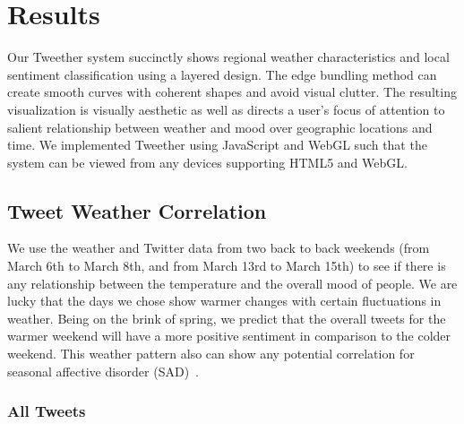 \section{Results}

Our Tweether system succinctly shows regional weather characteristics and local sentiment classification using a layered design. The edge bundling method can create smooth curves with coherent shapes and avoid visual clutter. The resulting visualization is visually aesthetic as well as directs a user's focus of attention to salient relationship between weather and mood over geographic locations and time. We implemented Tweether using JavaScript and WebGL such that the system can be viewed from any devices supporting HTML5 and WebGL.


%


\subsection{Tweet Weather Correlation}

We use the weather and Twitter data from two back to back weekends (from March 6th to March 8th, and from March 13rd to March 15th) to see if there is any relationship between the temperature and the overall mood of people. We are lucky that the days we chose show warmer changes with certain fluctuations in weather. Being on the brink of spring, we predict that the overall tweets for the warmer weekend will have a more positive sentiment in comparison to the colder weekend. This weather pattern also can show any potential correlation for seasonal affective disorder (SAD)~\cite{denissen2008effects}.

\subsubsection{All Tweets}



